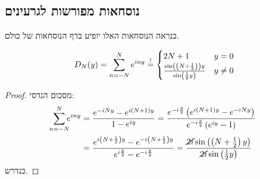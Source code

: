 \documentclass[]{../../../../tex/classes/styledArticle}
\begin{document}
	\subsection*{נוסחאות מפורשות לגרעינים}
	כנראה הנוסחאות האלו יופיע בדף הנוסחאות של כולם. 
	\begin{Lemma}
		\[ D_N(y) = \sum_{n = -N}^{N}e^{iny} \overset{!}{=} \begin{cases}
			2N + 1 & y = 0 \\
			\frac{\sin\left ( \left ( N + \frac{1}{2} \right ) \right )y}{\sin\left ( \frac{1}{2}y \right )} & y \neq 0
		\end{cases} \]
	\end{Lemma}\begin{proof}
		מסכום הנדסי: 
		\begin{align*}
			\sum_{\mathclap{n = -N}}^{N}e^{iny} &= \frac{e^{-iNy} - e^{i(N + 1)y}}{1 - e^{iy}} = \frac{e^{-i\frac{y}{2}}\cl{e^{i(N + 1)y} - e^{-iNy}}}{e^{-i\frac{y}{2}}\cl{e^{iy} - 1}} \\
			&= \frac{e^{i\cl{N + \frac{1}{2}}y} - e^{-i\cl{N + \frac{1}{2}}y}}{e^{i\frac{y}{2}} - e^{-i\frac{y}{2}}} = \frac{\cancel{2i}\sin\cl{\cl{N + \frac{1}{2}}y}}{\cancel{2i}\sin\cl{\frac{1}{2}y}}
		\end{align*}
		כנדרש. 
	\end{proof}
	
\end{document}
